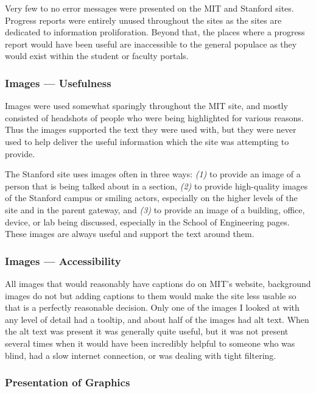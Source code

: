Very few to no error messages were presented on the MIT and Stanford sites.
Progress reports were entirely unused throughout the sites as the sites are dedicated to
information proliforation. Beyond that, the places where a progress report would have been
useful are inaccessible to the general populace as they would exist within the student or
faculty portals.

\subsubsection*{Images --- Usefulness}

Images were used somewhat sparingly throughout the MIT site, and mostly consisted of headshots of people who were
being highlighted for various reasons. Thus the images supported the text they were used
with, but they were never used to help deliver the useful information which the site
was attempting to provide.

The Stanford site uses images often in three ways: \textit{(1)} to provide an image
of a person that is being talked about in a section, \textit{(2)} to provide high-quality
images of the Stanford campus or smiling actors, especially on the higher levels of
the site and in the parent gateway, and \textit{(3)} to provide an image of a building,
office, device, or lab being discussed, especially in the School of Engineering
pages. These images are always useful and support the text around them.

\subsubsection*{Images --- Accessibility}

All images that would reasonably have captions do on MIT's website, background images do not but
adding captions to them would make the site less usable so that is a perfectly reasonable
decision. Only one of the images I looked at with any level of detail had a tooltip, and
about half of the images had alt text. When the alt text was present it was generally quite
useful, but it was not present several times when it would have been incredibly helpful to
someone who was blind, had a slow internet connection, or was dealing with tight filtering.


\subsubsection*{Presentation of Graphics}

